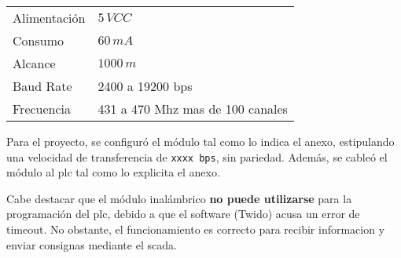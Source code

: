 \begin{center}
\begin{tabular}{|l|l|}
\hline
Alimentación & $5\,VCC$\\
Consumo& $60\,mA$\\
Alcance& $1000\,m$\\
Baud Rate &2400 a 19200 bps \\
Frecuencia& 431 a 470 Mhz mas de 100 canales\\
\hline
\end{tabular}
\end{center}

Para el proyecto, se configuró el módulo tal como lo indica el 
anexo, estipulando una velocidad de transferencia de 
\verb|xxxx bps|, sin pariedad. Además, se 
cableó el módulo al \gls{plc} tal como lo explicita el anexo.

Cabe destacar que el módulo inalámbrico \textbf{no puede utilizarse} para 
la programación del \gls{plc}, debido a que el software (Twido) acusa un error 
de timeout. No obstante, el funcionamiento es correcto para recibir informacion 
y enviar consignas mediante el \gls{scada}.